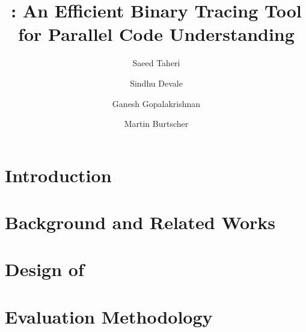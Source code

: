 \documentclass[sigconf,table]{acmart}
\begin{document}
\title{ \parlot:  An Efficient Binary Tracing Tool \\for Parallel Code Understanding}



\author{Saeed Taheri}

\author{Sindhu Devale}


\author{Ganesh Gopalakrishnan}

\author{Martin Burtscher}



\renewcommand{\shortauthors}{S. Taheri et al.}

\begin{abstract}
\label{abs}

\end{abstract}


\maketitle


\section{Introduction}
\label{sec:intro}



\section{Background and Related Works}
\label{sec:bgreltool}


\section{Design of \parlot}
\label{sec:design}


\section{Evaluation Methodology}
\label{sec:evalmeth}

\end{document}
